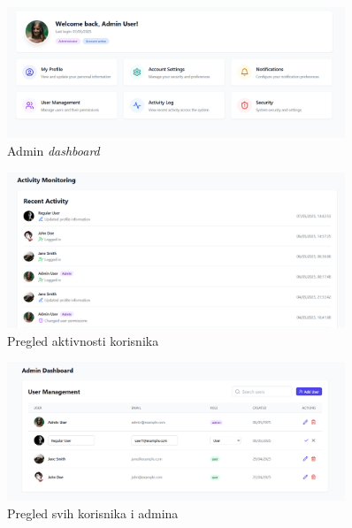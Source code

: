 \begin{figure}[H]
    \centering
    \includegraphics[width=0.9\textwidth]{Slike/fz3.5.png}
    \caption{Admin \textit{dashboard}}
    \label{fig:fz3.5}
\end{figure}

\begin{figure}[H]
    \centering
    \includegraphics[width=0.9\textwidth]{Slike/fz3.6.png}
    \caption{Pregled aktivnosti korisnika}
    \label{fig:fz3.6}
\end{figure}

\begin{figure}[H]
    \centering
    \includegraphics[width=0.9\textwidth]{Slike/fz3.7.png}
    \caption{Pregled svih korisnika i admina}
    \label{fig:fz3.7}
\end{figure}

